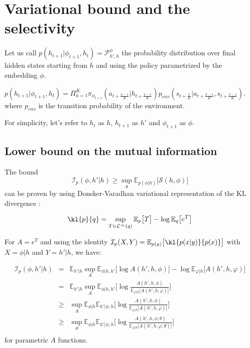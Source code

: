  \debutannexes
\section{Variational bound and the selectivity}
\label{appendix:bound}
Let us call $p(h_{t+1} | \phi_{t+1}, h_t) =  \mathcal{P}^\phi_{h' ,h}$ the probability distribution over final hidden states starting from $h$ and using the policy parametrized by the embedding $\phi$.

$p(h_{t+1} | \phi_{t+1}, h_t) = \Pi_{k=1}^{K}  \pi_{\phi_{t+1}}( a_{t+\frac{k-1}{K}} | h_{t+\frac{k-1}{K}}) p_{env}(s_{t+\frac{k}{K}} | a_{t+\frac{k-1}{K}}, s_{t+\frac{k-1}{K}})$.
where $p_{env}$ is the transition probability of the environment.

For simplicity, let's refer to $h_t$ as $h$, $h_{t+1}$ as $h'$ and $\phi_{t+1}$ as $\phi$.
\subsection{Lower bound on the mutual information}
The bound $$\mathcal{I}_p(\phi, h' | h) \ge \sup_\theta  \mathbb{E}_{p(\phi|h)} \big[ \mathcal{S}(h, \phi)\big]$$ can be proven by using Donsker-Varadhan variational representation of the KL divergence \citep{donsker1975asymptotic,ruderman2012tighter}:

$$\kl{p}{q} = \sup_{T \in \mathcal{L}^\infty(q)} \mathbb{E}_p \big[ T  \big] - \log \mathbb{E}_q \big[ e^T \big]$$

For $A = e^T$ and using the identity $\mathcal{I}_p(X, Y) = \mathbb{E}_{p(y)} \big[ \kl{p(x|y)}{p(x)}\big]$ with $X=\phi|h$ and $Y=h'|h$, we have:

\begin{eqnarray*}
\mathcal{I}_p(\phi, h' | h) &=& \mathbb{E}_{h'|h} \sup_A \mathbb{E}_{\phi|h, h'} \big[ \log A(h', h, \phi) \big] - \log \mathbb{E}_{\varphi|h} \big[ A(h', h, \varphi) \big]\\
&=& \mathbb{E}_{h'|h} \sup_A \mathbb{E}_{\phi|h, h'} \big[ \log \frac{ A(h', h, \phi)}{\mathbb{E}_{\varphi|h} \big[ A(h', h, \varphi)\big]}\big]\\
&\ge&  \sup_A \mathbb{E}_{\phi|h}\mathbb{E}_{h'|\phi, h} \big[ \log \frac{ A(h', h, \phi)}{\mathbb{E}_{\varphi|h} \big[ A(h', h, \varphi)\big]}\big]\\
&\ge&  \sup_\theta \mathbb{E}_{\phi|h}\mathbb{E}_{h'|\phi, h} \big[ \log \frac{ A(h', h, \phi; \theta)}{\mathbb{E}_{\varphi|h} \big[ A(h', h, \varphi; \theta)\big]}\big]\\
\end{eqnarray*}
for parametric $A$ functions.




